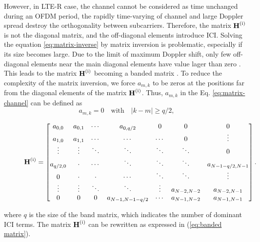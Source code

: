 \documentclass[AMA]{WileyNJD-v1}
\begin{document}
However, in LTE-R case, the channel cannot be considered as time  unchanged during an OFDM period, the rapidly time-varying of channel and large Doppler spread destroy the orthogonality between subcarriers. Therefore, the matrix $\rm{\textbf H^{(i)}}$ is not the diagonal matrix, and the off-diagonal elements introduce ICI. Solving  the equation \eqref{eq:matrix-inverse} by matrix inversion is problematic, especially if its size becomes large. Due to the limit of maximum Doppler shift, only few off-diagonal elements near the main diagonal elements have value lager than zero \cite{Jeon1999}. This leads to the matrix $\rm{\textbf H^{(i)}}$ becoming a banded matrix \cite{Cai2003}. To reduce the complexity of the matrix inversion, we force $a_{m,k}$ to be zeros at the positions far from the diagonal elements of the matrix $\rm{\textbf H^{(i)}}$. Thus,  $a_{m,k}$ in the Eq. \eqref{eq:matrix-channel} can be defined as
%
\begin{equation}
a_{m,k}=0\quad  \text{with}\quad  |k-m|\geqslant q/2,
\end{equation}
%
\begin{figure}
\begin{equation}\label{eq:banded matrix}
\begin{aligned}
		\rm {\textbf H^{(i)}} = \begin{bmatrix} 
		a_{0,0} & a_{0,1}& \cdots & a_{0,q/2} & 0 & 0 &0
		\\ a_{1,0} & a_{1,1} & \cdots & \cdots &\cdots& 0 & \vdots
		\\ \vdots & \vdots & \ddots & \ddots &\ddots & \ddots &0
		\\ a_{q/2,0} & \cdot & \cdots & \ddots & \ddots & \ddots & a_{N - 1 - q/2,N - 1}
		\\0&\cdot& \cdot& \cdots &\ddots& \ddots &\vdots
		\\ \vdots & \vdots & \ddots & \ddots & \vdots & a_{N - 2,N - 2}  & a_{N - 2,N - 1}
		\\0 &0&0 & a_{N - 1,N -1- q/2}& \cdots & a_{N - 1,N - 2}&a_{N - 1,N - 1}\end{bmatrix}.
	\end{aligned}
	\end{equation}
\end{figure}
where $q$ is the size of the band matrix, which indicates the number of dominant ICI terms. The matrix $\rm{\textbf H^{(i)}}$ can be rewritten as expressed in (\ref{eq:banded matrix}).
	
\end{document}
